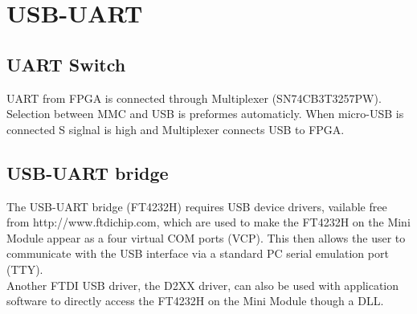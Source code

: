 \section{USB-UART}
\subsection{UART Switch}

UART from FPGA is connected through Multiplexer (SN74CB3T3257PW). Selection between MMC and USB is preformes automaticly. When micro-USB is connected S siglnal is high and Multiplexer connects USB to FPGA.\\ 

\subsection{USB-UART bridge}

The USB-UART bridge (FT4232H) requires USB device drivers, vailable free from http://www.ftdichip.com,
which are used to make the FT4232H on the Mini Module appear as a four virtual COM ports (VCP). This
then allows the user to communicate with the USB interface via a standard PC serial emulation port
(TTY).\\ Another FTDI USB driver, the D2XX driver, can also be used with application software to directly
access the FT4232H on the Mini Module though a DLL. \\

